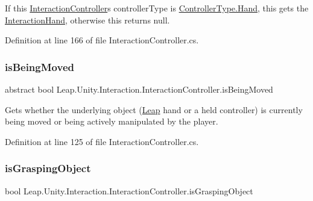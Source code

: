 If this \mbox{\hyperlink{class_leap_1_1_unity_1_1_interaction_1_1_interaction_controller}{Interaction\+Controller}}\textquotesingle{}s controller\+Type is \mbox{\hyperlink{namespace_leap_1_1_unity_1_1_interaction_a9752eb3e2905e8ebd134fff20c155e6baa78b1ac16c0cd02168097fc9a9bd7604}{Controller\+Type.\+Hand}}, this gets the \mbox{\hyperlink{class_leap_1_1_unity_1_1_interaction_1_1_interaction_hand}{Interaction\+Hand}}, otherwise this returns null. 



Definition at line 166 of file Interaction\+Controller.\+cs.

\mbox{\label{class_leap_1_1_unity_1_1_interaction_1_1_interaction_controller_a13751c0258117ae3af9b7d116f749a12}} 
\subsubsection{\texorpdfstring{isBeingMoved}{isBeingMoved}}
{\footnotesize\ttfamily abstract bool Leap.\+Unity.\+Interaction.\+Interaction\+Controller.\+is\+Being\+Moved\hspace{0.3cm}{\ttfamily [get]}}



Gets whether the underlying object (\mbox{\hyperlink{namespace_leap_1_1_unity_1_1_leap}{Leap}} hand or a held controller) is currently being moved or being actively manipulated by the player. 



Definition at line 125 of file Interaction\+Controller.\+cs.

\mbox{\label{class_leap_1_1_unity_1_1_interaction_1_1_interaction_controller_afd400c908dffa22a7fb025f067df34e5}} 
\subsubsection{\texorpdfstring{isGraspingObject}{isGraspingObject}}
{\footnotesize\ttfamily bool Leap.\+Unity.\+Interaction.\+Interaction\+Controller.\+is\+Grasping\+Object\hspace{0.3cm}{\ttfamily [get]}}



